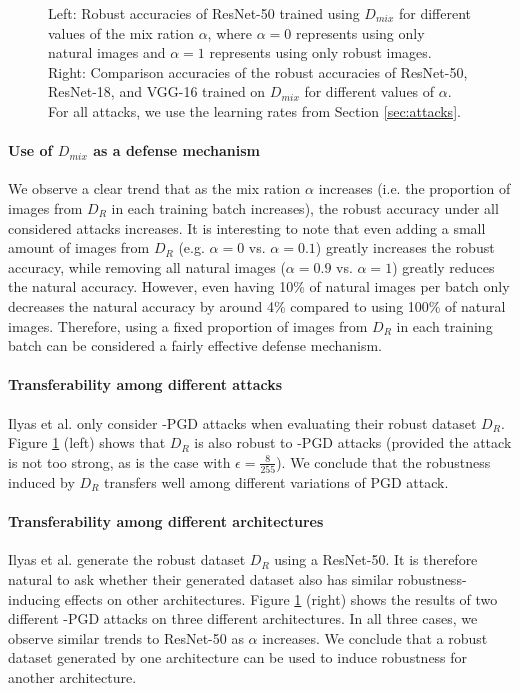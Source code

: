 \begin{figure}[htb]
\begin{center}
        \vspace{10pt}
        \caption{Left: Robust accuracies of ResNet-50 trained using $D_{mix}$ for different values of the mix ration $\alpha$, where $\alpha=0$ represents using only natural images and $\alpha=1$ represents using only robust images. Right: Comparison accuracies of the robust accuracies of ResNet-50, ResNet-18, and VGG-16 trained on $D_{mix}$ for different values of $\alpha$. For all attacks, we use the learning rates from Section \ref{sec:attacks}.} \label{fig:mix_results}
    \end{center}
    \vspace{-17pt}
\end{figure}

\paragraph{Use of $D_{mix}$ as a defense mechanism} We observe a clear trend that as the mix ration $\alpha$ increases (i.e. the proportion of images from $D_R$ in each training batch increases), the robust accuracy under all considered attacks increases. It is interesting to note that even adding a small amount of images from $D_R$ (e.g. $\alpha=0$ vs. $\alpha=0.1$) greatly increases the robust accuracy, while removing all natural images ($\alpha=0.9$ vs. $\alpha=1$) greatly reduces the natural accuracy. However, even having 10\% of natural images per batch only decreases the natural accuracy by around 4\% compared to using 100\% of natural images. Therefore, using a fixed proportion of images from $D_R$ in each training batch can be considered a fairly effective defense mechanism.

\paragraph{Transferability among different attacks} Ilyas et al. only consider \ltwo-PGD attacks when evaluating their robust dataset $D_R$. Figure \ref{fig:mix_results} (left) shows that $D_R$ is also robust to \linf-PGD attacks (provided the attack is not too strong, as is the case with $\epsilon=\frac{8}{255}$). We conclude that the robustness induced by $D_R$ transfers well among different variations of PGD attack.

\paragraph{Transferability among different architectures} Ilyas et al. generate the robust dataset $D_R$ using a ResNet-50. It is therefore natural to ask whether their generated dataset also has similar robustness-inducing effects on other architectures. Figure \ref{fig:mix_results} (right) shows the results of two different \ltwo-PGD attacks on three different architectures. In all three cases, we observe similar trends to ResNet-50 as $\alpha$ increases. We conclude that a robust dataset generated by one architecture can be used to induce robustness for another architecture.

